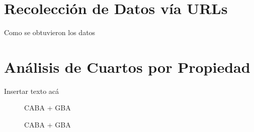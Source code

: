 \documentclass[a4paper, 10pt]{article}
\begin{document}
		\section{Recolección de Datos vía URLs}
		
			Como se obtuvieron los datos
		
		\section{Análisis de Cuartos por Propiedad}
		
			Insertar texto acá				
				
				\begin{figure}
    				\centering
    				\caption{CABA + GBA}
				\end{figure}
				
				\begin{figure}
    				\centering
    				\caption{CABA + GBA}
				\end{figure}
\end{document}
